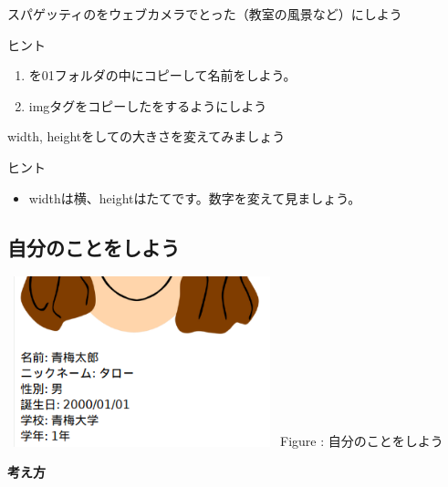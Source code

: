 \documentclass[a4paper,12pt]{jarticle}
\begin{document}
\theQuestion

スパゲッティのをウェブカメラでとった（教室の風景など）にしよう

ヒント

\begin{enumerate}
  \item
        を01フォルダの中にコピーして名前をしよう。
  \item
        imgタグをコピーしたをするようにしよう
\end{enumerate}
\theQuestion\label{Q:hasAnswer04-3}

width,
heightをしての大きさを変えてみましょう

ヒント

\begin{itemize}
  \item
        widthは横、heightはたてです。数字を変えて見ましょう。
\end{itemize}


\clearpage
{}
\subsection{\theExercise 自分のことをしよう}
\centering
\begin{minipage}{7.788cm}
  \includegraphics[width=7.788cm,height=4.927cm]{textbook-img173.png}
  \newline
  Figure : 自分のことをしよう
\end{minipage}

\bigskip

\flushleft

\textbf{考え方}
\end{document}
